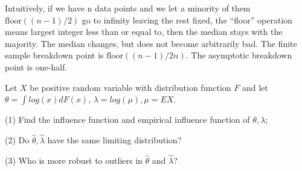 \begin{solution}
Intuitively\citep{Charles2006}, if we have n data points and we let a minority of them $\text{floor}((n - 1)/2)$ go to infinity leaving the rest fixed, the ``floor'' operation means largest integer less than or equal to, then the median stays with the majority. The median changes, but does not become arbitrarily bad. The finite sample breakdown point is $\text{floor}((n - 1)/2n)$. The asymptotic breakdown point is one-half.
\end{solution}





\begin{problem}
    Let $X$ be positive random variable with distribution function $F$ and let $\theta = \int log(x) d F(x)$, $\lambda = log (\mu), \mu = EX$. 

    (1) Find the influence function and empirical influence function of $\theta,\lambda$;

    (2) Do $\hat\theta,\hat\lambda$ have the same limiting distribution?

    (3) Who is more robust to outliers in $\hat\theta$ and $\hat\lambda$?
\end{problem}


